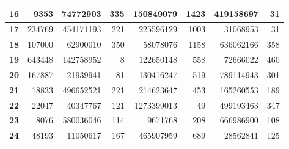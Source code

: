 \documentclass[12pt]{article}
\begin{document}
\begin{table}[!htbp]
{\begin{tabular}{crrrrrrr}
\multicolumn{1}{|c|}{\textbf{16}} & \multicolumn{1}{r|}{9353} & \multicolumn{1}{r|}{74772903} & \multicolumn{1}{r|}{335} & \multicolumn{1}{r|}{150849079} & \multicolumn{1}{r|}{1423} & \multicolumn{1}{r|}{419158697} & \multicolumn{1}{r|}{31} \\ \hline
\multicolumn{1}{|c|}{\textbf{17}} & \multicolumn{1}{r|}{234769} & \multicolumn{1}{r|}{454171193} & \multicolumn{1}{r|}{221} & \multicolumn{1}{r|}{225596129} & \multicolumn{1}{r|}{1003} & \multicolumn{1}{r|}{31068953} & \multicolumn{1}{r|}{31} \\ \hline
\multicolumn{1}{|c|}{\textbf{18}} & \multicolumn{1}{r|}{107000} & \multicolumn{1}{r|}{62900010} & \multicolumn{1}{r|}{350} & \multicolumn{1}{r|}{58078076} & \multicolumn{1}{r|}{1158} & \multicolumn{1}{r|}{636062166} & \multicolumn{1}{r|}{358} \\ \hline
\multicolumn{1}{|c|}{\textbf{19}} & \multicolumn{1}{r|}{643448} & \multicolumn{1}{r|}{142758952} & \multicolumn{1}{r|}{8} & \multicolumn{1}{r|}{122650148} & \multicolumn{1}{r|}{558} & \multicolumn{1}{r|}{72666022} & \multicolumn{1}{r|}{460} \\ \hline
\multicolumn{1}{|c|}{\textbf{20}} & \multicolumn{1}{r|}{167887} & \multicolumn{1}{r|}{21939941} & \multicolumn{1}{r|}{81} & \multicolumn{1}{r|}{130416247} & \multicolumn{1}{r|}{519} & \multicolumn{1}{r|}{789114943} & \multicolumn{1}{r|}{301} \\ \hline
\multicolumn{1}{|c|}{\textbf{21}} & \multicolumn{1}{r|}{18833} & \multicolumn{1}{r|}{496652521} & \multicolumn{1}{r|}{221} & \multicolumn{1}{r|}{214623647} & \multicolumn{1}{r|}{453} & \multicolumn{1}{r|}{165260553} & \multicolumn{1}{r|}{189} \\ \hline
\multicolumn{1}{|c|}{\textbf{22}} & \multicolumn{1}{r|}{22047} & \multicolumn{1}{r|}{40347767} & \multicolumn{1}{r|}{121} & \multicolumn{1}{r|}{1273399013} & \multicolumn{1}{r|}{49} & \multicolumn{1}{r|}{499193463} & \multicolumn{1}{r|}{347} \\ \hline
\multicolumn{1}{|c|}{\textbf{23}} & \multicolumn{1}{r|}{8076} & \multicolumn{1}{r|}{580036046} & \multicolumn{1}{r|}{114} & \multicolumn{1}{r|}{9671768} & \multicolumn{1}{r|}{208} & \multicolumn{1}{r|}{666986900} & \multicolumn{1}{r|}{108} \\ \hline
\multicolumn{1}{|c|}{\textbf{24}} & \multicolumn{1}{r|}{48193} & \multicolumn{1}{r|}{11050617} & \multicolumn{1}{r|}{167} & \multicolumn{1}{r|}{465907959} & \multicolumn{1}{r|}{689} & \multicolumn{1}{r|}{28562841} & \multicolumn{1}{r|}{125} \\ \hline

\end{tabular}}
\end{table}
\end{document}
